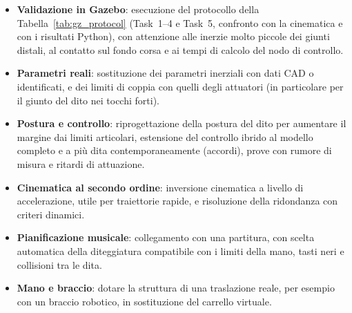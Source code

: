 \begin{itemize}
    \item \textbf{Validazione in Gazebo}: esecuzione del protocollo della Tabella~\ref{tab:gz_protocol} (Task~1--4 e Task~5, confronto con la cinematica e con i risultati Python), con attenzione alle inerzie molto piccole dei giunti distali, al contatto sul fondo corsa e ai tempi di calcolo del nodo di controllo.
    \item \textbf{Parametri reali}: sostituzione dei parametri inerziali con dati CAD o identificati, e dei limiti di coppia con quelli degli attuatori (in particolare per il giunto del dito nei tocchi forti).
    \item \textbf{Postura e controllo}: riprogettazione della postura del dito per aumentare il margine dai limiti articolari, estensione del controllo ibrido al modello completo e a più dita contemporaneamente (accordi), prove con rumore di misura e ritardi di attuazione.
    \item \textbf{Cinematica al secondo ordine}: inversione cinematica a livello di accelerazione, utile per traiettorie rapide, e risoluzione della ridondanza con criteri dinamici.
    \item \textbf{Pianificazione musicale}: collegamento con una partitura, con scelta automatica della diteggiatura compatibile con i limiti della mano, tasti neri e collisioni tra le dita.
    \item \textbf{Mano e braccio}: dotare la struttura di una traslazione reale, per esempio con un braccio robotico, in sostituzione del carrello virtuale.
\end{itemize}

